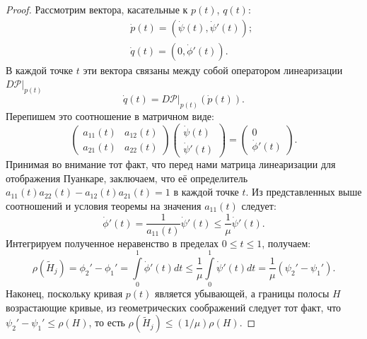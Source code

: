 \documentclass{article}
\begin{document}
\begin{proof}
Рассмотрим вектора, касательные к $p(t)$, $q(t)$:
\begin{eqnarray*}
	&& \dot{p}(t) = (\dot{\psi}(t), \dot{\psi}'(t)); \\
	&& \dot{q}(t) = (0, \dot{\phi}'(t)).
\end{eqnarray*}
В каждой точке $t$ эти вектора связаны между собой оператором линеаризации $D \mathcal{P} \vert_{p(t)}$
\begin{equation}
	\dot{q}(t) = D \mathcal{P} \vert_{p(t)} (\dot{p}(t)).
\end{equation}
Перепишем это соотношение в матричном виде:
\begin{equation}
	\begin{pmatrix}
		a_{11}(t) & a_{12}(t) \\ a_{21}(t) & a_{22}(t)
	\end{pmatrix}
	\begin{pmatrix}
		\dot{\psi}(t) \\
		\dot{\psi}'(t)
	\end{pmatrix} =
	\begin{pmatrix}
		0 \\ \dot{\phi}'(t)
	\end{pmatrix}.
\end{equation}
Принимая во внимание тот факт, что перед нами матрица линеаризации для отображения Пуанкаре, заключаем, что её определитель $a_{11}(t) a_{22}(t) - a_{12}(t) a_{21}(t) = 1$ в каждой точке $t$.
Из представленных выше соотношений и условия теоремы на значения $a_{11}(t)$ следует:
\begin{equation}
	\dot{\phi}'(t) = \dfrac{1}{a_{11}(t)} \dot{\psi}'(t) \le \dfrac{1}{\mu} \dot{\psi}'(t).
\end{equation}
Интегрируем полученное неравенство в пределах $0 \le t \le 1$, получаем:
\begin{equation}
	\rho(\widetilde{H}_j) = \phi_2' - \phi_1' = \int \limits_0^1 \dot{\phi}'(t) dt \le \dfrac{1}{\mu} \int \limits_0^1 \dot{\psi}'(t) dt = \dfrac{1}{\mu} (\psi_2' - \psi_1').
\end{equation}
Наконец, поскольку кривая $p(t)$ является убывающей, а границы полосы $H$ возрастающие кривые, из геометрических соображений следует тот факт, что $\psi_2' - \psi_1' \le \rho(H)$, то есть $\rho(\widetilde{H}_j) \le (1 / \mu) \rho(H)$.


\end{proof}
\end{document}
